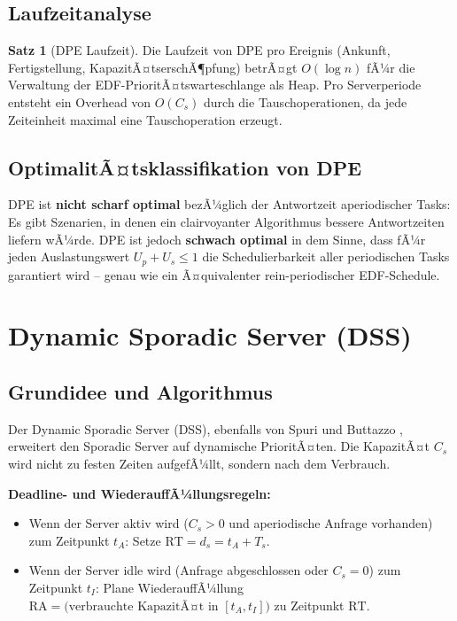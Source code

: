 ﻿\documentclass[a4paper,12pt]{report}
\theoremstyle{definition}
\newtheorem{satz}{Satz}[chapter]
\begin{document}
\subsection{Laufzeitanalyse}

\begin{satz}[DPE Laufzeit]
	Die Laufzeit von DPE pro Ereignis (Ankunft, Fertigstellung, KapazitÃ¤tserschÃ¶pfung)
	betrÃ¤gt $O(\log n)$ fÃ¼r die Verwaltung der EDF-PrioritÃ¤tswarteschlange als Heap.
	Pro Serverperiode entsteht ein Overhead von $O(C_s)$ durch die Tauschoperationen,
	da jede Zeiteinheit maximal eine Tauschoperation erzeugt.
\end{satz}

\subsection{OptimalitÃ¤tsklassifikation von DPE}

DPE ist \textbf{nicht scharf optimal} bezÃ¼glich der Antwortzeit aperiodischer Tasks:
Es gibt Szenarien, in denen ein clairvoyanter Algorithmus bessere Antwortzeiten
liefern wÃ¼rde. DPE ist jedoch \textbf{schwach optimal} in dem Sinne, dass fÃ¼r jeden
Auslastungswert $U_p + U_s \leq 1$ die Schedulierbarkeit aller periodischen Tasks
garantiert wird -- genau wie ein Ã¤quivalenter rein-periodischer EDF-Schedule.

\section{Dynamic Sporadic Server (DSS)}

\subsection{Grundidee und Algorithmus}

Der Dynamic Sporadic Server (DSS), ebenfalls von Spuri und Buttazzo \cite{Spuri1996},
erweitert den Sporadic Server auf dynamische PrioritÃ¤ten. Die KapazitÃ¤t $C_s$ wird
nicht zu festen Zeiten aufgefÃ¼llt, sondern nach dem Verbrauch.

\textbf{Deadline- und WiederauffÃ¼llungsregeln:}

\begin{itemize}
	\item Wenn der Server aktiv wird ($C_s > 0$ und aperiodische Anfrage vorhanden)
	      zum Zeitpunkt $t_A$: Setze $\mathrm{RT} = d_s = t_A + T_s$.
	\item Wenn der Server idle wird (Anfrage abgeschlossen oder $C_s = 0$)
	      zum Zeitpunkt $t_I$: Plane WiederauffÃ¼llung $\mathrm{RA} = \text{(verbrauchte KapazitÃ¤t in }[t_A, t_I])$ zu Zeitpunkt $\mathrm{RT}$.
\end{itemize}
\end{document}
